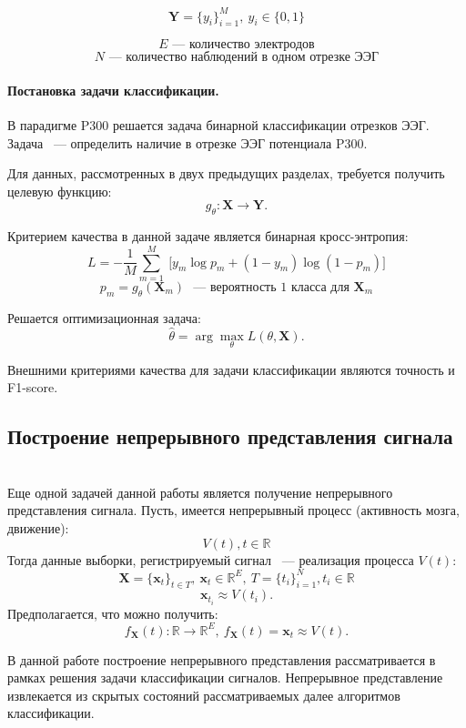\documentclass{article}
\newcommand{\x}{\mathbf{x}}
\newcommand{\Y}{\mathbf{Y}}
\newcommand{\X}{\mathbf{X}}
\newcommand{\R}{\mathbb{R}}
\begin{document}
    $$\Y = \{y_i\}_{i=1}^{M},\ y_i \in \{0, 1\}$$
    
    $$E \text{~--- количество электродов}$$
    $$N \text{~--- количество наблюдений в одном отрезке ЭЭГ}$$

    \paragraph{Постановка задачи классификации.}
    
    В парадигме P300 решается задача бинарной классификации отрезков ЭЭГ. Задача ~--- определить наличие в отрезке ЭЭГ потенциала P300.
    
    Для данных, рассмотренных в двух предыдущих разделах, требуется получить целевую функцию:
    $$g_{\theta}: \X \to \Y.$$
    
    Критерием качества в данной задаче является бинарная кросс-энтропия: 
    $$L =  -{\frac {1}{M}}\sum _{m=1}^{M}\ {\bigg [}y_{m}\log {p}_{m}+(1-y_{m})\log(1-{p}_{m}){\bigg ]}$$
    $$p_m = g_{\theta}(\X_m) \text{ ~--- вероятность 1 класса для } \X_m$$

    Решается оптимизационная задача:
    \begin{equation*}
    \hat{\theta} = \arg\max_{\theta} L(\theta, \X).
    \end{equation*}
    
    Внешними критериями качества для задачи классификации являются точность и F1-score.
    
\subsection{Построение непрерывного представления сигнала}\\
    
    Еще одной задачей данной работы является получение непрерывного представления сигнала. 
    Пусть, имеется непрерывный процесс (активность мозга, движение):
    $$V(t), t \in \R$$
    Тогда данные выборки, регистрируемый сигнал ~--- реализация процесса $V(t)$:
    $$\X = \{\x_t\}_{t\in T},\  \x_t \in \R^E,\  T = \{t_i\}_{i=1}^{N}, t_i \in \R$$ 
    $$\x_{t_i} \approx V(t_i).$$
    Предполагается, что можно получить:
    $$f_{\X}(t): \R \to \R^E, \ f_{\X}(t) = \x_t \approx V(t).$$

    В данной работе построение непрерывного представления рассматривается в рамках решения задачи классификации сигналов. Непрерывное представление извлекается из скрытых состояний рассматриваемых далее алгоритмов классификации.







\end{document}

